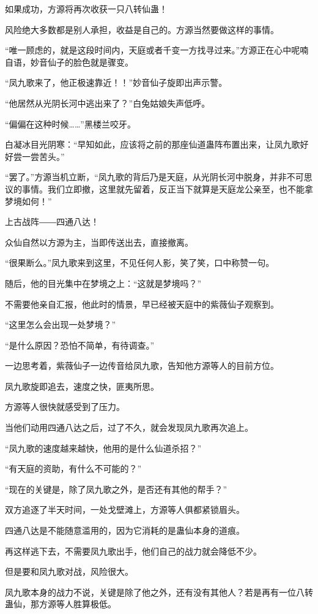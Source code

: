 \begin{this_body}
如果成功，方源将再次收获一只八转仙蛊！

风险绝大多数都是别人承担，收益是自己的。方源当然要做这样的事情。

“唯一顾虑的，就是这段时间内，天庭或者千变一方找寻过来。”方源正在心中呢喃自语，妙音仙子的脸色就是骤变。

“凤九歌来了，他正极速靠近！！”妙音仙子旋即出声示警。

“他居然从光阴长河中逃出来了？”白兔姑娘失声低呼。

“偏偏在这种时候……”黑楼兰咬牙。

白凝冰目光阴寒：“早知如此，应该将之前的那座仙道蛊阵布置出来，让凤九歌好好尝一尝苦头。”

“罢了。”方源当机立断，“凤九歌的背后乃是天庭，从光阴长河中脱身，并非不可思议的事情。我们立即撤，这里就先留着，反正当下就算是天庭龙公亲至，也不能拿梦境如何！”

上古战阵――四通八达！

众仙自然以方源为主，当即传送出去，直接撤离。

“很果断么。”凤九歌来到这里，不见任何人影，笑了笑，口中称赞一句。

随后，他的目光集中在梦境之上：“这就是梦境吗？”

不需要他亲自汇报，他此时的情景，早已经被天庭中的紫薇仙子观察到。

“这里怎么会出现一处梦境？”

“是什么原因？恐怕不简单，有待调查。”

一边思考着，紫薇仙子一边传音给凤九歌，告知他方源等人的目前方位。

凤九歌旋即追去，速度之快，匪夷所思。

方源等人很快就感受到了压力。

当他们动用四通八达之后，过了不久，就会发现凤九歌再次追上。

“凤九歌的速度越来越快，他用的是什么仙道杀招？”

“有天庭的资助，有什么不可能的？”

“现在的关键是，除了凤九歌之外，是否还有其他的帮手？”

双方追逐了半天时间，一处戈壁滩上，方源等人俱都紧锁眉头。

四通八达是不能随意滥用的，因为它消耗的是蛊仙本身的道痕。

再这样逃下去，不需要凤九歌出手，他们自己的战力就会降低不少。

但是要和凤九歌对战，风险很大。

凤九歌本身的战力不说，关键是除了他之外，还有没有其他人？若是再有一位八转蛊仙，那方源等人胜算极低。


\end{this_body}
